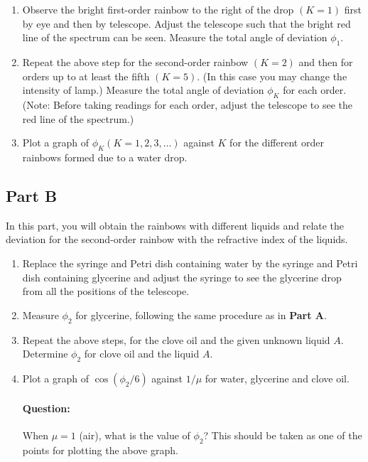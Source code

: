 \begin{enumerate}
    \item Observe the bright first-order rainbow to the right of the drop $(K = 1)$ first by eye and then by telescope. Adjust the telescope such that the bright red line of the spectrum can be seen. Measure the total angle of deviation $\phi_1$. 
    
    \item Repeat the above step for the second-order rainbow $(K = 2)$ and then for orders up to at least the fifth $(K = 5)$. (In this case you may change the intensity of lamp.) Measure the total angle of deviation $\phi_K$ for each order. (Note: Before taking readings for each order, adjust the telescope to see the red line of the spectrum.) 
    
    \item Plot a graph of $\phi_K (K = 1, 2, 3, \hdots)$ against $K$ for the different order rainbows formed due to a water drop.
\end{enumerate}


\subsection*{Part B}

In this part, you will obtain the rainbows with different liquids and relate the deviation for the second-order rainbow with the refractive index of the liquids.

\begin{enumerate}
    \item Replace the syringe and Petri dish containing water by the syringe and Petri dish containing glycerine and adjust the syringe to see the glycerine drop from all the positions of the telescope.
    
    \item Measure $\phi_2$ for glycerine, following the same procedure as in \textbf{Part A}.
    
    \item Repeat the above steps, for the clove oil and the given unknown liquid $A$. Determine $\phi_2$ for clove oil and the liquid $A$.
    
    \item Plot a graph of $\cos(\phi_2 / 6)$ against $1/\mu$ for water, glycerine and clove oil. 
    
    \begin{question}
    \paragraph{Question:} When $\mu = 1$ (air), what is the value of $\phi_2$? This should be taken as one of the points for plotting the above graph.
    \end{question}

\end{enumerate}

